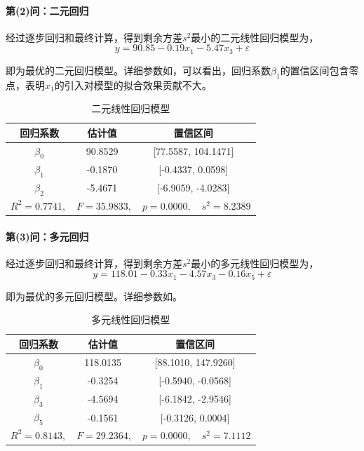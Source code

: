 \paragraph{第(2)问：二元回归} 经过逐步回归和最终计算，得到剩余方差$s^2$最小的二元线性回归模型为，
\begin{equation}\label{eq:ex7_double_best}
    y = 90.85 -0.19 x_1 -5.47 x_3 + \varepsilon
\end{equation}

即为最优的二元回归模型。详细参数如，可以看出，回归系数$\beta_1$的置信区间包含零点，表明$x_1$的引入对模型的拟合效果贡献不大。

\begin{table}[H]
    \centering
    \caption{二元线性回归模型}
    \label{tab:ex7_double_linear}
    \begin{tabular}{|c|c|c|}
        \hline
        回归系数 & 估计值 & 置信区间\\
        \hline
        \hline
        \(\beta_0\) & 90.8529 & [77.5587, 104.1471]\\
        \hline
        \(\beta_1\) & -0.1870 & [-0.4337, 0.0598]\\
        \hline
        \(\beta_2\) & -5.4671 & [-6.9059, -4.0283]\\
        \hline
        \multicolumn{3}{|c|}{$R^2=0.7741, \quad F=35.9833, \quad p=0.0000, \quad s^2=8.2389$}\\
        \hline
    \end{tabular}
\end{table}

\paragraph{第(3)问：多元回归} 经过逐步回归和最终计算，得到剩余方差$s^2$最小的多元线性回归模型为，
\begin{equation}\label{eq:ex7_multi_best}
    y = 118.01 -0.33 x_1 -4.57 x_3 -0.16 x_5 + \varepsilon
\end{equation}

即为最优的多元回归模型。详细参数如。

\begin{table}[H]
    \centering
    \caption{多元线性回归模型}
    \label{tab:ex7_multi_linear}
    \begin{tabular}{|c|c|c|}
        \hline
        回归系数 & 估计值 & 置信区间\\
        \hline
        \hline
        \(\beta_0\) & 118.0135 & [88.1010, 147.9260]\\
        \hline
        \(\beta_1\) & -0.3254 & [-0.5940, -0.0568]\\
        \hline
        \(\beta_3\) & -4.5694 & [-6.1842, -2.9546]\\
        \hline
        \(\beta_5\) & -0.1561 & [-0.3126, 0.0004]\\
        \hline
        \multicolumn{3}{|c|}{$R^2=0.8143, \quad F=29.2364, \quad p=0.0000, \quad s^2=7.1112$}\\
        \hline
    \end{tabular}
\end{table}

